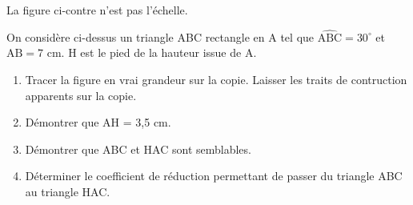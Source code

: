 \documentclass[exercice]{thedocument}%
\begin{document}
%
    \noindent
    \begin{minipage}[t]{.3\linewidth}
        \noindent La figure ci-contre n'est pas l'échelle.
    \end{minipage}\hfil
    \begin{minipage}[t]{.65\linewidth}
    \end{minipage}\medskip\par\noindent
    On considère ci-dessus un triangle ABC rectangle en A tel que
    $\widehat{\text{ABC}}=30^\circ$ et $\text{AB}=7$ cm. H est le pied de
    la hauteur issue de A.
    \begin{enumerate}
        \item Tracer la figure en vrai grandeur sur la copie. Laisser les traits
        de contruction apparents sur la copie.
        \item Démontrer que AH = 3,5 cm.
        \item Démontrer que ABC et HAC sont semblables.
        \item Déterminer le coefficient de réduction permettant de passer
        du triangle ABC au triangle HAC.
    \end{enumerate}
    \showthesource
\end{document}
